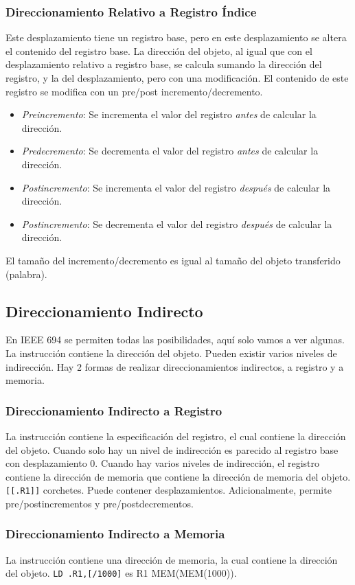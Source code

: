 \documentclass[a4paper,11pt,spanish]{report}
\begin{document}
\subsubsection{Direccionamiento Relativo a Registro Índice}
Este desplazamiento tiene un registro base, pero en este desplazamiento se altera el contenido del registro base. La dirección del objeto, al igual que con el desplazamiento relativo a registro base, se calcula sumando la dirección del registro, y la del desplazamiento, pero con una modificación.
El contenido de este registro se modifica con un pre/post incremento/decremento.
\begin{itemize}
\item \emph{Preincremento}: Se incrementa el valor del registro \emph{antes} de calcular la dirección.
\item \emph{Predecremento}: Se decrementa el valor del registro \emph{antes} de calcular la dirección.
\item \emph{Postincremento}: Se incrementa el valor del registro \emph{después} de calcular la dirección.
\item \emph{Postincremento}: Se decrementa el valor del registro \emph{después} de calcular la dirección.
\end{itemize}
El tamaño del incremento/decremento es igual al tamaño del objeto transferido (palabra).
\subsection{Direccionamiento Indirecto}
En IEEE 694 se permiten todas las posibilidades, aquí solo vamos a ver algunas. La instrucción contiene la dirección del objeto. Pueden existir varios niveles de indirección. Hay 2 formas de realizar direccionamientos indirectos, a registro y a memoria.
\subsubsection{Direccionamiento Indirecto a Registro}
La instrucción contiene la especificación del registro, el cual contiene la dirección del objeto. Cuando solo hay un nivel de indirección es parecido al registro base con desplazamiento 0. Cuando hay varios niveles de indirección, el registro contiene la dirección de memoria que contiene la dirección de memoria del objeto. \verb|[[.R1]]|  corchetes.
Puede contener desplazamientos. Adicionalmente, permite pre/postincrementos y pre/postdecrementos.
\subsubsection{Direccionamiento Indirecto a Memoria}
La instrucción contiene una dirección de memoria, la cual contiene la dirección del objeto. \verb|LD .R1,[/1000]| es R1 \textleftarrow MEM(MEM(1000)).
\end{document}
